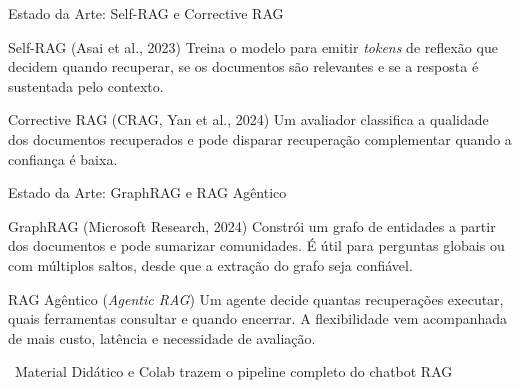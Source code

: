 \documentclass[aspectratio=169]{beamer}
\begin{document}
\begin{frame}[shrink=5]{Estado da Arte: Self-RAG e Corrective RAG}
    \begin{block}{Self-RAG (Asai et al., 2023)}
        \footnotesize Treina o modelo para emitir \textit{tokens} de reflexão que decidem quando recuperar, se os documentos são relevantes e se a resposta é sustentada pelo contexto.
    \end{block}
    \pause
    \begin{block}{Corrective RAG (CRAG, Yan et al., 2024)}
        \footnotesize Um avaliador classifica a qualidade dos documentos recuperados e pode disparar recuperação complementar quando a confiança é baixa.
    \end{block}
\end{frame}

\begin{frame}{Estado da Arte: GraphRAG e RAG Agêntico}
    \begin{block}{GraphRAG (Microsoft Research, 2024)}
        \footnotesize Constrói um grafo de entidades a partir dos documentos e pode sumarizar comunidades. É útil para perguntas globais ou com múltiplos saltos, desde que a extração do grafo seja confiável.
    \end{block}
    \pause
    \begin{block}{RAG Agêntico (\textit{Agentic RAG})}
        \footnotesize Um agente decide quantas recuperações executar, quais ferramentas consultar e quando encerrar. A flexibilidade vem acompanhada de mais custo, latência e necessidade de avaliação.
    \end{block}
    \vspace{0.2cm}
    \centering\tiny {}\ Material Didático e Colab trazem o pipeline completo do chatbot RAG
\end{frame}
\end{document}
